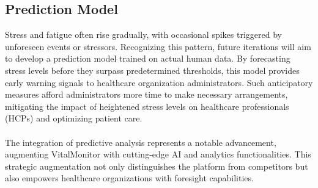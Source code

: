 \subsection{Prediction Model}
Stress and fatigue often rise gradually, with occasional spikes triggered by unforeseen events or stressors. Recognizing this pattern, future iterations will aim to develop a prediction model trained on actual human data. By forecasting stress levels before they surpass predetermined thresholds, this model provides early warning signals to healthcare organization administrators. Such anticipatory measures afford administrators more time to make necessary arrangements, mitigating the impact of heightened stress levels on healthcare professionals (HCPs) and optimizing patient care.\\\\
The integration of predictive analysis represents a notable advancement, augmenting VitalMonitor with cutting-edge AI and analytics functionalities. This strategic augmentation not only distinguishes the platform from competitors but also empowers healthcare organizations with foresight capabilities.